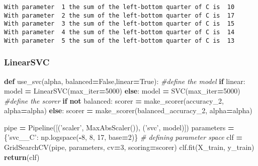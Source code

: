 \documentclass[10pt,a4paper]{article}
\newenvironment{Shaded}{\begin{snugshade}}{\end{snugshade}}
\newcommand{\CommentTok}[1]{\textcolor[rgb]{0.56,0.35,0.01}{\textit{#1}}}
\newcommand{\ControlFlowTok}[1]{\textcolor[rgb]{0.13,0.29,0.53}{\textbf{#1}}}
\newcommand{\DecValTok}[1]{\textcolor[rgb]{0.00,0.00,0.81}{#1}}
\newcommand{\KeywordTok}[1]{\textcolor[rgb]{0.13,0.29,0.53}{\textbf{#1}}}
\newcommand{\NormalTok}[1]{#1}
\newcommand{\OperatorTok}[1]{\textcolor[rgb]{0.81,0.36,0.00}{\textbf{#1}}}
\newcommand{\StringTok}[1]{\textcolor[rgb]{0.31,0.60,0.02}{#1}}
\newcommand{\VariableTok}[1]{\textcolor[rgb]{0.00,0.00,0.00}{#1}}
\theoremstyle{break}
\begin{document}
\begin{verbatim}
With parameter  1 the sum of the left-bottom quarter of C is  10
With parameter  2 the sum of the left-bottom quarter of C is  17
With parameter  3 the sum of the left-bottom quarter of C is  15
With parameter  4 the sum of the left-bottom quarter of C is  14
With parameter  5 the sum of the left-bottom quarter of C is  13
\end{verbatim}

\hypertarget{linearsvc}{%
\subsubsection{LinearSVC}\label{linearsvc}}

\begin{Shaded}
\begin{Highlighting}[]
\KeywordTok{def}\NormalTok{ use_svc(alpha, balanced}\OperatorTok{=}\VariableTok{False}\NormalTok{,linear}\OperatorTok{=}\VariableTok{True}\NormalTok{):}
    \CommentTok{#define the model}
    \ControlFlowTok{if}\NormalTok{ linear:}
\NormalTok{         model }\OperatorTok{=}\NormalTok{ LinearSVC(max_iter}\OperatorTok{=}\DecValTok{5000}\NormalTok{)}
    \ControlFlowTok{else}\NormalTok{:}
\NormalTok{         model }\OperatorTok{=}\NormalTok{  SVC(max_iter}\OperatorTok{=}\DecValTok{5000}\NormalTok{)}
    \CommentTok{#define the scorer}
    \ControlFlowTok{if} \KeywordTok{not}\NormalTok{ balanced:}
\NormalTok{        scorer }\OperatorTok{=}\NormalTok{ make_scorer(accuracy_2, alpha}\OperatorTok{=}\NormalTok{alpha)}
    \ControlFlowTok{else}\NormalTok{:}
\NormalTok{        scorer }\OperatorTok{=}\NormalTok{ make_scorer(balanced_accuracy_2, alpha}\OperatorTok{=}\NormalTok{alpha)  }
        
\NormalTok{    pipe }\OperatorTok{=}\NormalTok{ Pipeline([(}\StringTok{'scaler'}\NormalTok{, MaxAbsScaler()), (}\StringTok{'svc'}\NormalTok{, model)])}
\NormalTok{    parameters }\OperatorTok{=}\NormalTok{ \{}\StringTok{'svc__C'}\NormalTok{: np.logspace(}\OperatorTok{-}\DecValTok{8}\NormalTok{, }\DecValTok{8}\NormalTok{, }\DecValTok{17}\NormalTok{, base}\OperatorTok{=}\DecValTok{2}\NormalTok{)\} }\CommentTok{# defining parameter space}
\NormalTok{    clf }\OperatorTok{=}\NormalTok{ GridSearchCV(pipe, parameters, cv}\OperatorTok{=}\DecValTok{3}\NormalTok{, scoring}\OperatorTok{=}\NormalTok{scorer)}
\NormalTok{    clf.fit(X_train, y_train)}
    \ControlFlowTok{return}\NormalTok{(clf)}
\end{Highlighting}
\end{Shaded}
\end{document}
